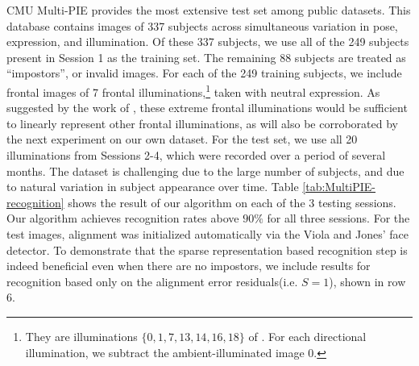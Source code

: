 \documentclass[12pt,journal,draftcls,letterpaper,onecolumn]{IEEEtran}
\begin{document}
CMU Multi-PIE provides the most extensive test set among public
datasets. This database contains images of 337 subjects across
simultaneous variation in pose, expression, and illumination.
Of these 337 subjects, we use all of the 249 subjects present
in Session 1 as the training set. The remaining 88 subjects are
treated as ``impostors'', or invalid images. For each of the
249 training subjects, we include frontal images of 7 frontal
illuminations,\footnote{They are illuminations
$\{0,1,7,13,14,16,18\}$ of \cite{Gross2008-FGR}. For each
directional illumination, we subtract the ambient-illuminated
image 0.} taken with neutral expression. As suggested by the
work of \cite{Georghiades2001-PAMI}, these extreme frontal
illuminations would be sufficient to linearly represent other
frontal illuminations, as will also be corroborated by the next
experiment on our own dataset. For the test set, we use all 20
illuminations from Sessions 2-4, which were recorded 
over a period of several months. The dataset is
challenging due to the large number of subjects, and due to
natural variation in subject appearance over time. Table
\ref{tab:MultiPIE-recognition} shows the result of our
algorithm on each of the 3 testing sessions. Our algorithm
achieves recognition rates above $90\%$ for all three sessions.
For the test images, 
alignment was initialized automatically via the Viola and Jones'
face detector. 
To demonstrate that the sparse representation based recognition step is indeed beneficial
even when there are no impostors, we include results for recognition
based only on the alignment error residuals(i.e. $S=1$), shown in row 6.
\end{document}
